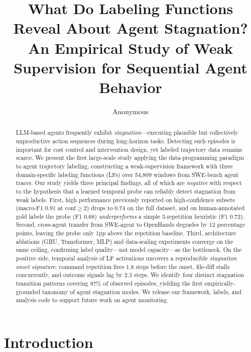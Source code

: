\documentclass[11pt]{article}
\title{What Do Labeling Functions Reveal About Agent Stagnation? \\
An Empirical Study of Weak Supervision for Sequential Agent Behavior}
\author{Anonymous}
\date{}
\begin{document}
\maketitle

\begin{abstract}
LLM-based agents frequently exhibit \emph{stagnation}---executing plausible but collectively unproductive action sequences during long-horizon tasks.
Detecting such episodes is important for cost control and intervention design, yet labeled trajectory data remains scarce.
We present the first large-scale study applying the data-programming paradigm to agent trajectory labeling, constructing a weak-supervision framework with three domain-specific labeling functions (LFs) over 54,809 windows from SWE-bench agent traces.
Our study yields three principal findings, all of which are \emph{negative} with respect to the hypothesis that a learned temporal probe can reliably detect stagnation from weak labels.
First, high performance previously reported on high-confidence subsets (macro-F1 0.91 at $\text{conf}\!\geq\!2$) drops to 0.74 on the full dataset, and on human-annotated gold labels the probe (F1 0.68) \emph{underperforms} a simple 3-repetition heuristic (F1 0.72).
Second, cross-agent transfer from SWE-agent to OpenHands degrades by 12 percentage points, leaving the probe only 1pp above the repetition baseline.
Third, architecture ablations (GRU, Transformer, MLP) and data-scaling experiments converge on the same ceiling, confirming label quality---not model capacity---as the bottleneck.
On the positive side, temporal analysis of LF activations uncovers a reproducible \emph{stagnation onset signature}: command repetition fires 1.8 steps before the onset, file-diff stalls concurrently, and outcome signals lag by 2.3 steps.
We identify four distinct stagnation transition patterns covering 87\% of observed episodes, yielding the first empirically-grounded taxonomy of agent stagnation modes.
We release our framework, labels, and analysis code to support future work on agent monitoring.
\end{abstract}

\section{Introduction}
\label{sec:intro}
\end{document}
